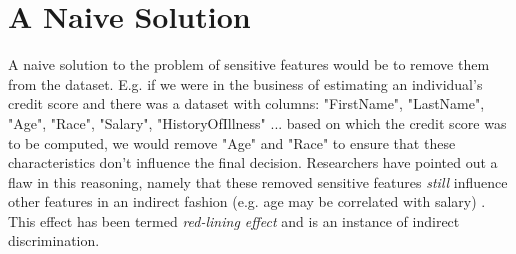 \documentclass[a4paper, 12pt, titlepage]{article}
\begin{document}

\section*{A Naive Solution}

A naive solution to the problem of sensitive features would be to remove them from the dataset. E.g. if we were in the business of estimating an individual's credit score and there was a dataset with columns: "FirstName", "LastName", "Age", "Race", "Salary", "HistoryOfIllness" ... based on which the credit score was to be computed, we would remove "Age" and "Race" to ensure that these characteristics don't influence the final decision.
Researchers have pointed out a flaw in this reasoning, namely that these removed sensitive features \emph{still} influence other features in an indirect fashion (e.g. age may be correlated with salary) \cite[p.~36]{kamishima2012a} \cite[p.~378]{kamishima2012b} \cite[p.~381]{kamishima2012b}. This effect has been termed \emph{red-lining effect} and is an instance of indirect discrimination. \cite[p.~380]{kamishima2012b}


\end{document}
